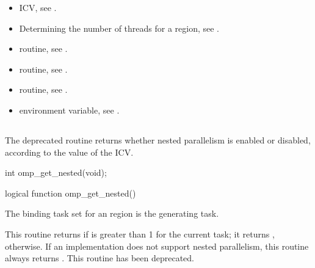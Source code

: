 \crossreferences
\begin{itemize}
\item {} ICV, see
.

\item Determining the number of threads for a  region, see
.

\item {} routine, see .

\item {} routine, see
.

\item {} routine, see
.

\item {} environment variable, see
.
\end{itemize}








\subsection{}
\label{subsec:omp_get_nested}
\summary
The deprecated  routine returns whether nested parallelism is
enabled or disabled, according to the value of the 
ICV.

\format
\begin{ccppspecific}
\begin{ompcFunction}
int omp_get_nested(void);
\end{ompcFunction}
\end{ccppspecific}

\begin{fortranspecific}
\begin{ompfFunction}
logical function omp_get_nested()
\end{ompfFunction}
\end{fortranspecific}

\binding
The binding task set for an  region is the generating task.

\effect
This routine returns  if  is greater than
1 for the current task; it returns , otherwise. If an
implementation does not support nested parallelism, this routine always
returns .  This routine has been deprecated.

